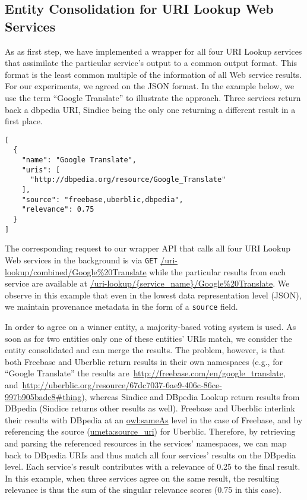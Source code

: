 \documentclass{acm_proc_article-sp}
\newcommand{\nofootnote}[1]{~#1}
\begin{document}
\subsection{Entity Consolidation for URI Lookup Web Services}               \label{sec:consolidation-uri}
As as first step, we have implemented a wrapper for all four URI Lookup services that assimilate the particular
service's output to a common output format. This format is the least common multiple of the information of all Web
service results. For our experiments, we agreed on the JSON format. In the example below, we use the term ``Google
Translate'' to illustrate the approach. Three services return back a dbpedia URI, Sindice being the only one returning
a different result in a first place.
\begin{lstlisting}
[
  {
    "name": "Google Translate",
    "uris": [
      "http://dbpedia.org/resource/Google_Translate"
    ],
    "source": "freebase,uberblic,dbpedia",
    "relevance": 0.75
  }
]
\end{lstlisting}

The corresponding request to our wrapper API that calls all four URI Lookup Web services in the background is via
\texttt{GET}
\url{/uri-lookup/combined/Google%20Translate} while the particular results from each service are available at
\url{/uri-lookup/{service_name}/Google%
We observe in this example that even in the lowest data representation level (JSON), we maintain provenance metadata in
the form of a \texttt{source} field.

In order to agree on a winner entity, a majority-based voting system is used. As soon as for two entities only one of
these entities' URIs match, we consider the entity consolidated and can merge the results. The problem, however, is
that both Freebase and Uberblic return results in their own namespaces (e.g., for ``Google Translate'' the results
are\nofootnote{\url{http://freebase.com/en/google_translate}},
and\nofootnote{\url{http://uberblic.org/resource/67dc7037-6ae9-406c-86ce-997b905badc8#thing}}), whereas Sindice and
DBpedia Lookup return results from DBpedia (Sindice returns other results as well). Freebase and Uberblic interlink
their results with DBpedia at an \url{owl:sameAs} level in the case of Freebase, and by referencing the source
(\url{umeta:source_uri}) for Uberblic. Therefore, by retrieving and parsing the referenced resources in the services'
namespaces, we can map back to DBpedia URIs and thus match all four services' results on the DBpedia level. Each
service's result contributes with a relevance of 0.25 to the final result. In this example, when three services agree
on the same result, the resulting relevance is thus the sum of the singular relevance scores (0.75 in this case).
\end{document}
